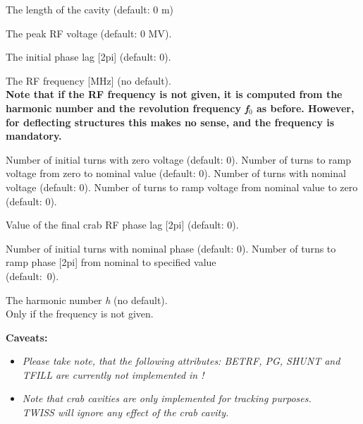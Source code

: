 \begin{madlist}
   The length of the cavity (default: 0 m) 

   The peak RF voltage (default: 0 MV). 

   The initial phase lag [2pi] (default: 0). 

   The RF frequency [MHz] (no default). \\[3mm]
    {\bf Note that if the RF frequency is not given, it is computed from the
    harmonic number and the revolution frequency \textit{f$_0$} as before. 
    However, for deflecting structures this makes no sense, and the 
    frequency is mandatory.} 

   Number of initial turns with zero voltage (default: 0). 
   Number of turns to ramp voltage from zero to nominal value (default: 0). 
   Number of turns with nominal voltage (default: 0). 
   Number of turns to ramp voltage from nominal value to zero (default: 0).  

   Value of the final crab RF phase lag [2pi] (default: 0).

   Number of initial turns with nominal phase (default: 0). 
   Number of turns to ramp phase [2pi] from nominal to
    specified value \\ (default:~0). 

   The harmonic number \textit{h} (no default). \\
    Only if the frequency is not given. 

\end{madlist}


{\bf Caveats:}
\begin{itemize}
   \item \textit{ Please take note, that the following \madeight attributes:
     BETRF, PG, SHUNT and TFILL are currently not implemented in \madx!}
   \item \textit{ Note that crab cavities are only implemented for
     tracking  purposes. \\ TWISS will ignore any effect of the crab cavity.  
   }
\end{itemize} 

